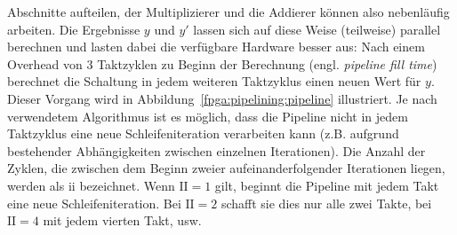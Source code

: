 Abschnitte aufteilen, der Multiplizierer und die Addierer können also
nebenläufig arbeiten. Die Ergebnisse $y$ und $y'$ lassen sich auf diese Weise
(teilweise) parallel berechnen und lasten dabei die verfügbare Hardware besser
aus: Nach einem Overhead von 3 Taktzyklen zu Beginn der Berechnung (engl.
\textit{pipeline fill time}) berechnet die Schaltung in jedem weiteren
Taktzyklus einen neuen Wert für $y$. Dieser Vorgang wird in
Abbildung~\ref{fpga:pipelining:pipeline} illustriert. Je nach verwendetem
Algorithmus ist es möglich, dass die Pipeline nicht in jedem Taktzyklus eine
neue Schleifeniteration verarbeiten kann (z.B. aufgrund bestehender
Abhängigkeiten zwischen einzelnen Iterationen). Die Anzahl der Zyklen, die
zwischen dem Beginn zweier aufeinanderfolgender Iterationen liegen, werden als
\gls{ii} bezeichnet. Wenn $\text{II} = 1$ gilt, beginnt die Pipeline mit
jedem Takt eine neue Schleifeniteration. Bei $\text{II} = 2$ schafft sie dies
nur alle zwei Takte, bei $\text{II} = 4$ mit jedem vierten Takt, usw.
\cite[vgl.][20--21]{hlsintro2019}

